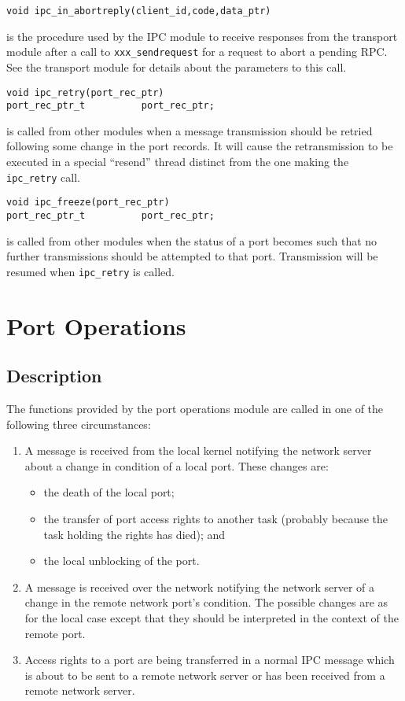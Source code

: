 \begin{verbatim}
void ipc_in_abortreply(client_id,code,data_ptr)
\end{verbatim}
is the procedure used by the IPC module to receive responses from the
transport module after a call to \verb"xxx_sendrequest" for a request
to abort a pending RPC.  See the transport module for details about
the parameters to this call.

\begin{verbatim}
void ipc_retry(port_rec_ptr)
port_rec_ptr_t          port_rec_ptr;
\end{verbatim}
is called from other modules when a message transmission should be retried
following some change in the port records.  It will cause the retransmission
to be executed in a special ``resend'' thread distinct from the one making
the \verb"ipc_retry" call.

\begin{verbatim}
void ipc_freeze(port_rec_ptr)
port_rec_ptr_t          port_rec_ptr;
\end{verbatim}
is called from other modules when the status of a port becomes such that no
further transmissions should be attempted to that port. Transmission
will be resumed when \verb"ipc_retry" is called.

\section{Port Operations}
\subsection{Description}
The functions provided by the port operations module are called in one of
the following three circumstances:
\begin{enumerate}
\item A message is received from the local kernel notifying the network server
about a change in condition of a local port.  These changes are:
\begin{itemize}
\item the death of the local port;

\item the transfer of port access rights to another task
(probably because the task holding the rights has died); and

\item the local unblocking of the port.
\end{itemize}

\item A message is received over the network notifying the network server of a
change in the remote network port's condition.  The possible changes are as
for the local case except that they should be interpreted in the context of
the remote port.

\item Access rights to a port are being transferred in a normal IPC message
which is about to be sent to a remote network server or has been received
from a remote network server.
\end{enumerate}

